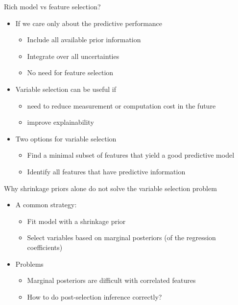 \documentclass[english,t]{beamer}
\begin{document}
\begin{frame}{}

  {\Large\color{navyblue} Rich model vs feature selection?}

  \begin{itemize}
  \item If we care only about the predictive performance
    \begin{itemize}
    \item Include all available prior information
    \item Integrate over all uncertainties
    \item No need for feature selection
    \end{itemize}
  \item<2-> Variable selection can be useful if
    \begin{itemize}
    \item need to reduce measurement or computation cost in the future
    \item improve explainability
    \end{itemize}
  \item<3-> Two options for variable selection
    \begin{itemize}
    \item Find a minimal subset of features that yield a good
      predictive model
    \item Identify all features that have predictive information
    \end{itemize}
  \end{itemize}
  
\end{frame}

\begin{frame}{}

  {\Large\color{navyblue} Why shrinkage priors alone do not solve the
    variable selection problem}

  \begin{itemize}
  \item A common strategy:
    \begin{itemize}
    \item Fit model with a shrinkage prior
    \item Select variables based on marginal posteriors (of the
      regression coefficients)
    \end{itemize}
  \item<2-> Problems
    \begin{itemize}
    \item Marginal posteriors are difficult with correlated features
    \item How to do post-selection inference correctly?
    \end{itemize}
  \end{itemize}
\end{frame}
\end{document}
